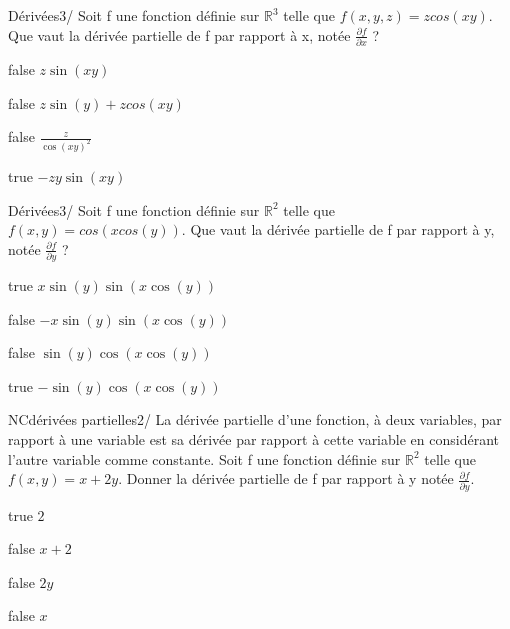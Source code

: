 \documentclass[11pt]{article}
\begin{document}
         \begin{question}{22}{Dérivées}{3}{/}
               Soit f une fonction définie sur $\mathbb{R}^{3}$ telle que $f(x,y,z) = zcos(xy)$. Que vaut la dérivée partielle de f par rapport à x, notée $\frac{\partial f}{\partial x}$ ?
        \end{question}
        \begin{reponses}
        	\item[false]  $z\sin(xy)$
        	\item[false]  $z\sin(y)+zcos(xy)$
            \item[false]  $\frac{z}{\cos(xy)^2}$
            \item[true]  $-zy\sin(xy)$
        \end{reponses}
        
        
         \begin{question}{22}{Dérivées}{3}{/}
               Soit f une fonction définie sur $\mathbb{R}^{2}$ telle que $f(x,y) = cos(xcos(y))$. Que vaut la dérivée partielle de f par rapport à y, notée $\frac{\partial f}{\partial y}$ ?
        \end{question}
        \begin{reponses}
        	\item[true]  $x\sin(y)\sin(x\cos(y))$
        	\item[false]  $-x\sin(y)\sin(x\cos(y))$
            \item[false]  $\sin(y)\cos(x\cos(y))$
            \item[true]  $-\sin(y)\cos(x\cos(y))$
        \end{reponses}
        
        
          \begin{question}{NC}{dérivées partielles}{2}{/} 
            La dérivée partielle d'une fonction, à deux variables, par rapport à une variable est sa dérivée par rapport à cette variable en considérant l'autre variable comme constante. Soit f une fonction définie sur $\mathbb{R}^{2}$ telle que $f(x,y) = x + 2y $. Donner la dérivée partielle de f par rapport à y notée $\frac{\partial f}{\partial y}$.  
            \end{question}

            \begin{reponses}
            	\item[true]  $2$
            	\item[false]  $x+2$
                \item[false]   $2y$
                \item[false]    $x$
            \end{reponses}
			
\end{document}

